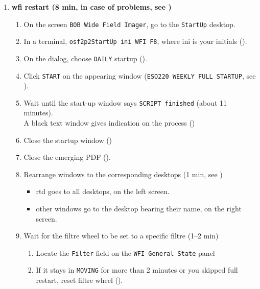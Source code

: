 \documentclass[11pt,fleqn,a4paper]{book}
\begin{document}
\label{proc:startup}
\begin{enumerate}
  \item \label{list:wfistartup}\textbf{\gls{wfi} restart (8 min, in case of problems, see )}
        \begin{enumerate}
          \item On the screen \texttt{BOB Wide Field Imager}, go to the \texttt{StartUp} \gls{desktop}.\label{list:wfi1}
          \item In a terminal, \texttt{\gls{osf2p2StartUp} ini WFI F8}, where ini is your initials ().
          \item On the dialog, choose \texttt{DAILY} startup ().
          \item Click \texttt{START} on the appearing window (\texttt{ESO220 WEEKLY FULL STARTUP}, see ). 
          \item Wait until the start-up window says \texttt{SCRIPT finished} (about 11 minutes).\\
          A black text window gives indication on the process ()
                \label{list:wfibooted}
          \item Close the startup window ()
          \item Close the emerging PDF ().
          \item Rearrange windows to the corresponding \gls{desktop}s (1 min, see )
             \label{list:wfiwin}
             \begin{itemize}
                \item \gls{rtd} goes to all \gls{desktop}s, on the left screen.
                \item other windows go to the \gls{desktop} bearing their name, on the right screen. 
            \end{itemize}
          \item Wait for the filtre wheel to be set to a specific filtre (1--2 min)\label{list:wfisu-filtre}
                \begin{enumerate}
                    \item Locate the \texttt{Filter} field on the \texttt{WFI \gls{General State}} panel
                    \item If it stays in \texttt{MOVING} for more than 2 minutes or you skipped full restart, reset filtre wheel (). 

\end{enumerate}
\end{enumerate}
\end{enumerate}
\end{document}
